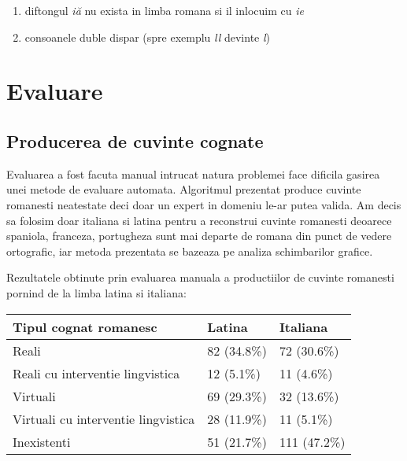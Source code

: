 \begin{enumerate}
  \item diftongul \textit{iă} nu exista in limba romana si il inlocuim cu \textit{ie}
  \item consoanele duble dispar (spre exemplu \textit{ll} devinte \textit{l})
\end{enumerate}

\section{Evaluare}

\subsection{Producerea de cuvinte cognate}
Evaluarea a fost facuta manual intrucat natura problemei face dificila gasirea unei metode de evaluare
automata. Algoritmul prezentat produce cuvinte romanesti neatestate deci doar un expert in domeniu
le-ar putea valida. Am decis sa folosim doar italiana si latina pentru a reconstrui cuvinte romanesti
deoarece spaniola, franceza, portugheza sunt mai departe de romana din punct de vedere ortografic,
iar metoda prezentata se bazeaza pe analiza schimbarilor grafice.

Rezultatele obtinute prin evaluarea manuala a productiilor de cuvinte romanesti pornind de la limba
latina si italiana:
\begin{center}
  \begin{tabular}{|| l l l ||}
    \hline
    Tipul cognat romanesc & Latina & Italiana \\[0.5ex]
    \hline
    \hline
    Reali                                & 82 (34.8\%)  & 72 (30.6\%) \\
    \hline
    Reali cu interventie lingvistica     & 12 (5.1\%)   & 11 (4.6\%) \\
    \hline
    Virtuali                             & 69 (29.3\%)  & 32 (13.6\%) \\
    \hline
    Virtuali cu interventie lingvistica  & 28 (11.9\%)  & 11 (5.1\%) \\
    \hline
    Inexistenti                          & 51 (21.7\%)  & 111 (47.2\%) \\
    \hline
  \end{tabular}
\end{center}

